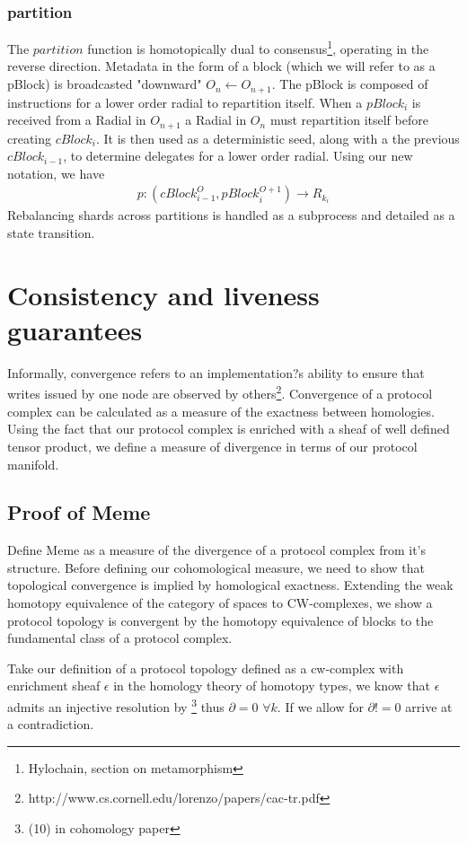 \documentclass{article}
\begin{document}
\subsubsection{partition}
The $partition$ function is homotopically dual to consensus\footnote{Hylochain, section on metamorphism}, operating in the reverse direction. Metadata in the form of a block (which we will refer to as a pBlock) is broadcasted "downward" $O_{n} \leftarrow O_{n+1}$. The pBlock is composed of instructions for a lower order radial to repartition itself. When a $pBlock_{i}$ is received from a Radial in $O_{n+1}$ a Radial in $O_{n}$ must repartition itself before creating $cBlock_{i}$. It is then used as a deterministic seed, along with a the previous  $cBlock_{i-1}$, to determine delegates for a lower order radial.  Using our new notation, we have
\begin{align*}
p: (cBlock^{O}_{i-1}, pBlock^{O+1}_{i}) \rightarrow R_{k_i}
\end{align*}
Rebalancing shards across partitions is handled as a subprocess and detailed as a state transition.



\section{Consistency and liveness guarantees}
Informally, convergence refers to an implementation?s ability to ensure that writes issued by one node are
observed by others\footnote{http://www.cs.cornell.edu/lorenzo/papers/cac-tr.pdf}. Convergence of a protocol complex can be calculated as a measure of the exactness between homologies. Using the fact that our protocol complex is enriched with a sheaf of well defined tensor product, we define a measure of divergence in terms of our protocol manifold.

\subsection{Proof of Meme}
Define Meme as a measure of the divergence of a protocol complex from it's structure. Before defining our cohomological measure, we need to show that topological convergence is implied by homological exactness. Extending the weak homotopy equivalence of the category of spaces to CW-complexes, we show a protocol topology is convergent by the homotopy equivalence of blocks to the fundamental class of a protocol complex.

Take our definition of a protocol topology defined as a cw-complex with enrichment sheaf $\epsilon$ in the homology theory of homotopy types, we know that $\epsilon$ admits an injective resolution by \footnote{(10) in cohomology paper} thus $\partial = 0$ $\forall k$. If we allow for $\partial != 0$ arrive at a contradiction. 
\end{document}
